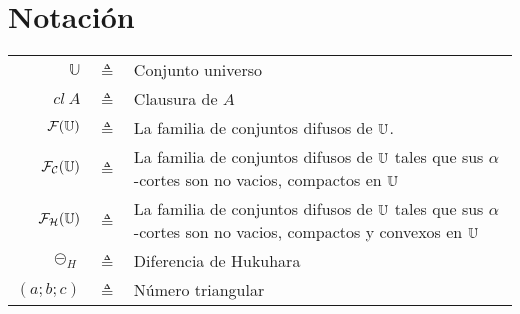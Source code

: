 \chapter*{Notación}
\begin{table}[htbp]
  \centering %
  \begin{tabular}{r c p{10cm} }
    \toprule
    $\mathbb{U}$ & $\triangleq$ & Conjunto universo\\
    $cl~A$ &  $\triangleq$ & Clausura de $A$ \\
    $\mathcal{F}(\mathbb U)$ & $\triangleq$ & La familia de conjuntos difusos de $\mathbb U$.\\
    $\mathcal{F}_\mathcal{C}(\mathbb U)$ & $\triangleq$ & La familia de conjuntos difusos de $\mathbb U$ tales que sus $\alpha$-cortes son no vacios, compactos en $\mathbb U$ \\
    $\mathcal{F}_\mathcal{H}(\mathbb U)$ & $\triangleq$ & La familia de conjuntos difusos de $\mathbb U$ tales que sus $\alpha$-cortes son no vacios, compactos y convexos en $\mathbb U$ \\
    $\circleddash_H $ & $\triangleq$ & Diferencia de Hukuhara \\
    $(a;b;c)$ & $\triangleq$ & Número triangular \\
    \bottomrule
  \end{tabular}
  \label{tab:notacion}
\end{table}
